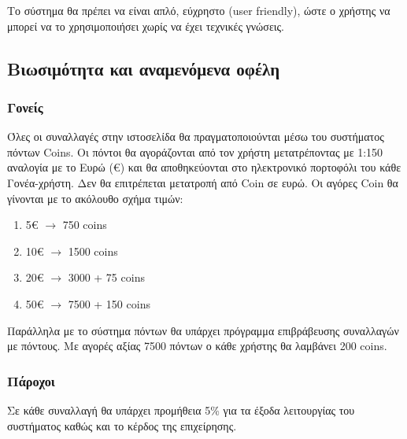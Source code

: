 \documentclass[letterpaper,6pt]{article}
\begin{document}
Το σύστημα θα πρέπει να είναι απλό, εύχρηστο (user friendly), ώστε ο χρήστης να μπορεί να το χρησιμοποιήσει χωρίς να έχει τεχνικές γνώσεις.


\subsection{Βιωσιμότητα και αναμενόμενα οφέλη}

\subsubsection{Γονείς}


Όλες οι συναλλαγές στην ιστοσελίδα θα πραγματοποιούνται μέσω του συστήματος πόντων Coins. Οι πόντοι θα αγοράζονται από τον χρήστη μετατρέποντας με 1:150 αναλογία με το Ευρώ (€) και θα αποθηκεύονται στο ηλεκτρονικό πορτοφόλι του κάθε Γονέα-χρήστη. Δεν θα επιτρέπεται μετατροπή από Coin σε ευρώ. Οι αγόρες Coin θα γίνονται με το ακόλουθο σχήμα τιμών:

\begin{enumerate}
  \item 5€ $\to{}$ 750 coins
  \item 10€ $\to{}$ 1500 coins
  \item 20€ $\to{}$ 3000 + 75 coins
  \item 50€ $\to{}$ 7500 + 150 coins
\end{enumerate}

Παράλληλα με το σύστημα πόντων θα υπάρχει πρόγραμμα επιβράβευσης συναλλαγών με πόντους. Με αγορές αξίας 7500 πόντων ο κάθε χρήστης θα λαμβάνει 200 coins.


\subsubsection{Πάροχοι}

Σε κάθε συναλλαγή θα υπάρχει προμήθεια 5\% %
για τα έξοδα λειτουργίας του συστήματος καθώς και το κέρδος της επιχείρησης.
\end{document}
